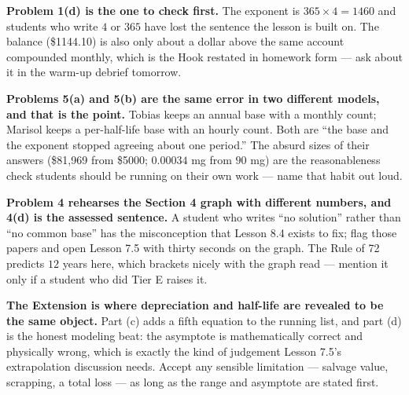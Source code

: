 \documentclass[10pt]{article}
\begin{document}
\begin{teachernote}
\textbf{Problem 1(d) is the one to check first.} The exponent is $365\times4=1460$ and students who
write $4$ or $365$ have lost the sentence the lesson is built on. The balance (\$1144.10) is also only
about a dollar above the same account compounded monthly, which is the Hook restated in homework form
--- ask about it in the warm-up debrief tomorrow.

\textbf{Problems 5(a) and 5(b) are the same error in two different models, and that is the point.}
Tobias keeps an annual base with a monthly count; Marisol keeps a per-half-life base with an hourly
count. Both are ``the base and the exponent stopped agreeing about one period.'' The absurd sizes of
their answers (\$81{,}969 from \$5000; $0.00034$ mg from $90$ mg) are the reasonableness check students
should be running on their own work --- name that habit out loud.

\textbf{Problem 4 rehearses the Section 4 graph with different numbers, and 4(d) is the assessed
sentence.} A student who writes ``no solution'' rather than ``no common base'' has the misconception
that Lesson 8.4 exists to fix; flag those papers and open Lesson 7.5 with thirty seconds on the graph.
The Rule of 72 predicts $12$ years here, which brackets nicely with the graph read --- mention it only
if a student who did Tier E raises it.

\textbf{The Extension is where depreciation and half-life are revealed to be the same object.} Part (c)
adds a fifth equation to the running list, and part (d) is the honest modeling beat: the asymptote is
mathematically correct and physically wrong, which is exactly the kind of judgement Lesson 7.5's
extrapolation discussion needs. Accept any sensible limitation --- salvage value, scrapping, a total
loss --- as long as the range and asymptote are stated first.
\end{teachernote}
\end{document}
